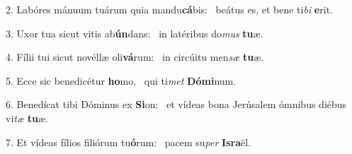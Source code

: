 2. Labóres mánuum tuárum quia mandu\textbf{cá}bis: \ast\  beátus es, et bene ti\textit{bi} \textbf{e}rit.\

3. Uxor tua sicut vitis ab\textbf{ún}dans: \ast\  in latéribus do\textit{mus} \textbf{tu}æ.\

4. Fílii tui sicut novéllæ oli\textbf{vá}rum: \ast\  in circúitu men\textit{sæ} \textbf{tu}æ.\

5. Ecce sic benedicétur \textbf{ho}mo, \ast\  qui ti\textit{met} \textbf{Dó}\textbf{mi}num.\

6. Benedícat tibi Dóminus ex \textbf{Si}on: \ast\  et vídeas bona Jerúsalem ómnibus diébus vi\textit{tæ} \textbf{tu}æ.\

7. Et vídeas fílios filiórum tu\textbf{ó}rum: \ast\  pacem su\textit{per} \textbf{Is}\textbf{ra}ël.\

